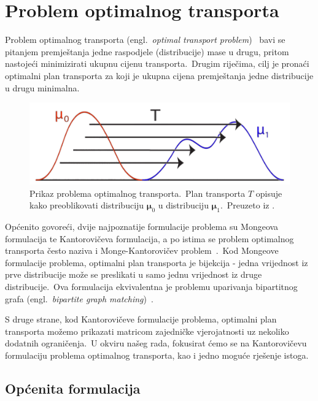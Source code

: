 \documentclass[diplomskirad]{fer}
\begin{document}
\chapter{Problem optimalnog transporta}
\label{pog:transport}

Problem optimalnog transporta (engl.\ \textit{optimal transport problem})~\cite{peyre2019computational} bavi se pitanjem premještanja jedne raspodjele (distribucije) mase u drugu, pritom nastojeći minimizirati ukupnu cijenu transporta.\ 
Drugim riječima, cilj je pronaći optimalni plan transporta za koji je ukupna cijena premještanja jedne distribucije u drugu minimalna.\ 

\begin{figure}[h]
  \centering
  \includegraphics[scale=0.75]{./Slike/optimalni_transport.png}
  \caption{Prikaz problema optimalnog transporta.\ Plan transporta $T$ opisuje kako preoblikovati distribuciju $\bm{\mu}_0$ u distribuciju $\bm{\mu}_1$.\ Preuzeto iz \cite{papadakis2015optimal}.}
  \label{fig:ot_problem}
\end{figure}
  
Općenito govoreći, dvije najpoznatije formulacije problema su Mongeova formulacija te Kantorovičeva formulacija, a po istima se problem optimalnog transporta često naziva i Monge-Kantorovičev problem~\cite{bogachev2012monge}.\ 
Kod Mongeove formulacije problema, optimalni plan transporta je bijekcija - jedna vrijednost iz prve distribucije može se preslikati u samo jednu vrijednost iz druge distribucije.\ 
Ova formulacija ekvivalentna je problemu uparivanja bipartitnog grafa (engl.\ \textit{bipartite graph matching})~\cite{karp1990optimal}.\ 
  
S druge strane, kod Kantorovičeve formulacije problema, optimalni plan transporta možemo prikazati matricom zajedničke vjerojatnosti uz nekoliko dodatnih ograničenja.\ 
U okviru našeg rada, fokusirat ćemo se na Kantorovičevu formulaciju problema optimalnog transporta, kao i jedno moguće rješenje istoga.\

\section{Općenita formulacija}
\label{sek:opcenito_transport}
\end{document}
